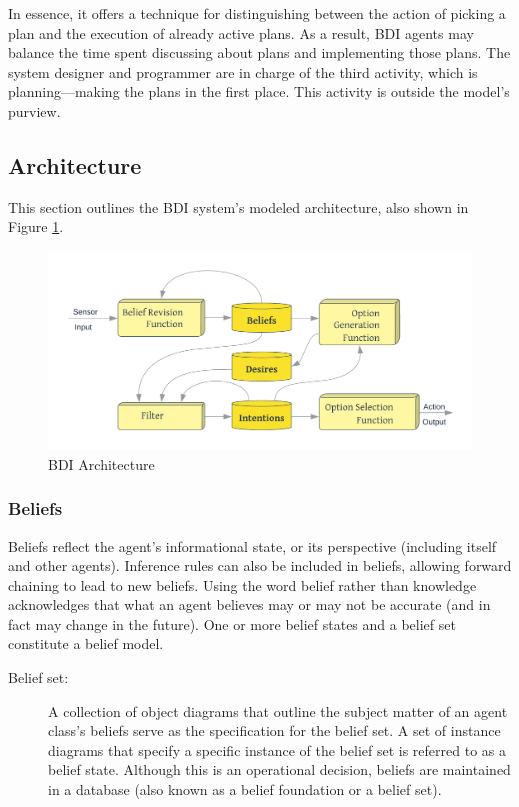 In essence, it offers a technique for distinguishing between the action of picking a plan and the execution of already active plans. As a result, \ac{BDI} agents may balance the time spent discussing about plans and implementing those plans. The system designer and programmer are in charge of the third activity, which is planning—making the plans in the first place. This activity is outside the model's purview.

\subsection{Architecture}

This section outlines the \ac{BDI} system's modeled architecture, also shown in Figure \ref{BDI Architecture}.

    \begin{figure}[h]
    \centering
      \includegraphics[width=12cm]{includes/figures/BDI_arch.png}
      \caption{\ac{BDI} Architecture}
      \label{BDI Architecture}
    \end{figure}
    
\subsubsection{Beliefs}
    Beliefs reflect the agent's informational state, or its perspective (including itself and other agents). Inference rules can also be included in beliefs, allowing forward chaining to lead to new beliefs. Using the word belief rather than knowledge acknowledges that what an agent believes may or may not be accurate (and in fact may change in the future). One or more belief states and a belief set constitute a belief model.
 
    \begin{description}
        \item[Belief set:]
        A collection of object diagrams that outline the subject matter of an agent class's beliefs serve as the specification for the belief set. A set of instance diagrams that specify a specific instance of the belief set is referred to as a belief state. Although this is an operational decision, beliefs are maintained in a database (also known as a belief foundation or a belief set).
    \end{description}

